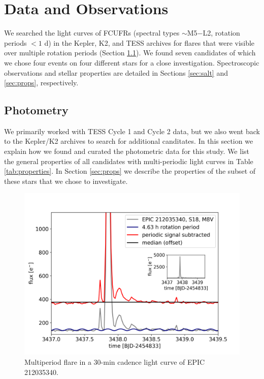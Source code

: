\documentclass[fleqn,usenatbib,letters]{mnras}%
\newcommand{\FD}{EPIC 212035340} %
\begin{document}
\section{Data and Observations}
\label{sec:data}
We searched the light curves of FCUFRs (spectral types $\sim$M5$-$L2, rotation periods $< 1$ d) in the Kepler, K2, and TESS archives for flares that were visible over multiple rotation periods (Section \ref{sec:photometry}). We found seven candidates of which we chose four events on four different stars for a close investigation. Spectroscopic observations and stellar properties are detailed in Sections \ref{sec:salt} and \ref{sec:props}, respectively.
%
\subsection{Photometry}
\label{sec:photometry}
We primarily worked with TESS Cycle 1 and Cycle 2 data, but we also went back to the Kepler/K2 archives to search for additional canditates. In this section we explain how we found and curated the photometric data for this study. We list the general properties of all candidates with multi-periodic light curves in Table \ref{tab:properties}. In Section \ref{sec:props} we describe the properties of the subset of these stars that we chose to investigate.
\begin{figure}
	\includegraphics[width=\columnwidth]{figures/EPIC212035340_inset.png}
    \caption{Multiperiod flare in a 30-min cadence light curve of \FD.}
    \label{fig:\FD}
\end{figure}
\end{document}
